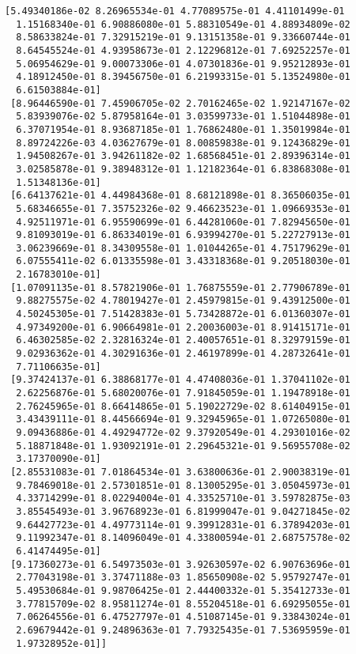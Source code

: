 \documentclass[11pt]{article}
\begin{document}
\begin{Verbatim}[commandchars=\\\{\}]
 [5.49340186e-02 8.26965534e-01 4.77089575e-01 4.41101499e-01
  1.15168340e-01 6.90886080e-01 5.88310549e-01 4.88934809e-02
  8.58633824e-01 7.32915219e-01 9.13151358e-01 9.33660744e-01
  8.64545524e-01 4.93958673e-01 2.12296812e-01 7.69252257e-01
  5.06954629e-01 9.00073306e-01 4.07301836e-01 9.95212893e-01
  4.18912450e-01 8.39456750e-01 6.21993315e-01 5.13524980e-01
  6.61503884e-01]
 [8.96446590e-01 7.45906705e-02 2.70162465e-02 1.92147167e-02
  5.83939076e-02 5.87958164e-01 3.03599733e-01 1.51044898e-01
  6.37071954e-01 8.93687185e-01 1.76862480e-01 1.35019984e-01
  8.89724226e-03 4.03627679e-01 8.00859838e-01 9.12436829e-01
  1.94508267e-01 3.94261182e-02 1.68568451e-01 2.89396314e-01
  3.02585878e-01 9.38948312e-01 1.12182364e-01 6.83868308e-01
  1.51348136e-01]
 [6.64137621e-01 4.44984368e-01 8.68121898e-01 8.36506035e-01
  5.68346655e-01 7.35752326e-02 9.46623523e-01 1.09669353e-01
  4.92511971e-01 6.95590699e-01 6.44281060e-01 7.82945650e-01
  9.81093019e-01 6.86334019e-01 6.93994270e-01 5.22727913e-01
  3.06239669e-01 8.34309558e-01 1.01044265e-01 4.75179629e-01
  6.07555411e-02 6.01335598e-01 3.43318368e-01 9.20518030e-01
  2.16783010e-01]
 [1.07091135e-01 8.57821906e-01 1.76875559e-01 2.77906789e-01
  9.88275575e-02 4.78019427e-01 2.45979815e-01 9.43912500e-01
  4.50245305e-01 7.51428383e-01 5.73428872e-01 6.01360307e-01
  4.97349200e-01 6.90664981e-01 2.20036003e-01 8.91415171e-01
  6.46302585e-02 2.32816324e-01 2.40057651e-01 8.32979159e-01
  9.02936362e-01 4.30291636e-01 2.46197899e-01 4.28732641e-01
  7.71106635e-01]
 [9.37424137e-01 6.38868177e-01 4.47408036e-01 1.37041102e-01
  2.62256876e-01 5.68020076e-01 7.91845059e-01 1.19478918e-01
  2.76245965e-01 8.66414865e-01 5.19022729e-02 8.61404915e-01
  3.43439111e-01 8.44566694e-01 9.32945965e-01 1.07265080e-01
  9.09436886e-01 4.49294772e-02 9.37920549e-01 4.29301016e-02
  5.18871848e-01 1.93092191e-01 2.29645321e-01 9.56955708e-02
  3.17370090e-01]
 [2.85531083e-01 7.01864534e-01 3.63800636e-01 2.90038319e-01
  9.78469018e-01 2.57301851e-01 8.13005295e-01 3.05045973e-01
  4.33714299e-01 8.02294004e-01 4.33525710e-01 3.59782875e-03
  3.85545493e-01 3.96768923e-01 6.81999047e-01 9.04271845e-02
  9.64427723e-01 4.49773114e-01 9.39912831e-01 6.37894203e-01
  9.11992347e-01 8.14096049e-01 4.33800594e-01 2.68757578e-02
  6.41474495e-01]
 [9.17360273e-01 6.54973503e-01 3.92630597e-02 6.90763696e-01
  2.77043198e-01 3.37471188e-03 1.85650908e-02 5.95792747e-01
  5.49530684e-01 9.98706425e-01 2.44400332e-01 5.35412733e-01
  3.77815709e-02 8.95811274e-01 8.55204518e-01 6.69295055e-01
  7.06264556e-01 6.47527797e-01 4.51087145e-01 9.33843024e-01
  2.69679442e-01 9.24896363e-01 7.79325435e-01 7.53695959e-01
  1.97328952e-01]]
    \end{Verbatim}
\end{document}
